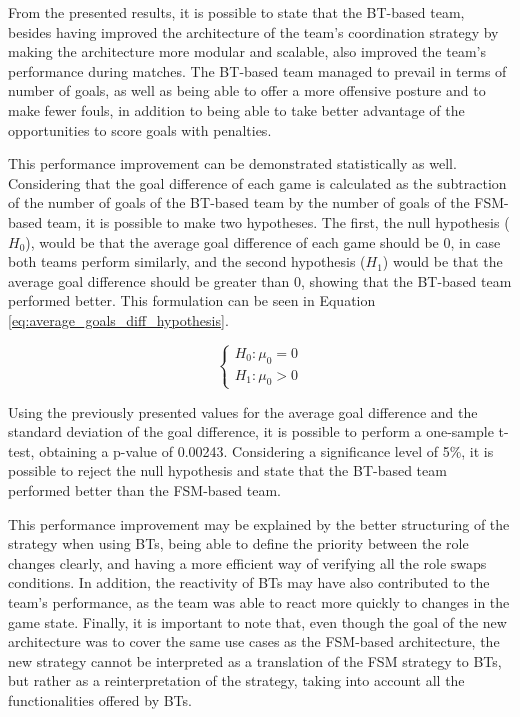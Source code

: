 From the presented results, it is possible to state that the BT-based team, besides having improved the architecture of the team's coordination strategy by making the architecture more modular and scalable, also improved the team's performance during matches. The BT-based team managed to prevail in terms of number of goals, as well as being able to offer a more offensive posture and to make fewer fouls, in addition to being able to take better advantage of the opportunities to score goals with penalties.

This performance improvement can be demonstrated statistically as well. Considering that the goal difference of each game is calculated as the subtraction of the number of goals of the BT-based team by the number of goals of the FSM-based team, it is possible to make two hypotheses. The first, the null hypothesis ($H_0$), would be that the average goal difference of each game should be 0, in case both teams perform similarly, and the second hypothesis ($H_1$) would be that the average goal difference should be greater than 0, showing that the BT-based team performed better. This formulation can be seen in Equation \ref{eq:average_goals_diff_hypothesis}.

\begin{equation}
    \left\{
    \begin{aligned}
        H_0: \mu_0 = 0 \\
        H_1: \mu_0 > 0
    \end{aligned}
    \right.
    \label{eq:average_goals_diff_hypothesis}
\end{equation}

Using the previously presented values for the average goal difference and the standard deviation of the goal difference, it is possible to perform a one-sample t-test, obtaining a p-value of 0.00243. Considering a significance level of 5\%, it is possible to reject the null hypothesis and state that the BT-based team performed better than the FSM-based team.

This performance improvement may be explained by the better structuring of the strategy when using BTs, being able to define the priority between the role changes clearly, and having a more efficient way of verifying all the role swaps conditions. In addition, the reactivity of BTs may have also contributed to the team's performance, as the team was able to react more quickly to changes in the game state. Finally, it is important to note that, even though the goal of the new architecture was to cover the same use cases as the FSM-based architecture, the new strategy cannot be interpreted as a translation of the FSM strategy to BTs, but rather as a reinterpretation of the strategy, taking into account all the functionalities offered by BTs.

